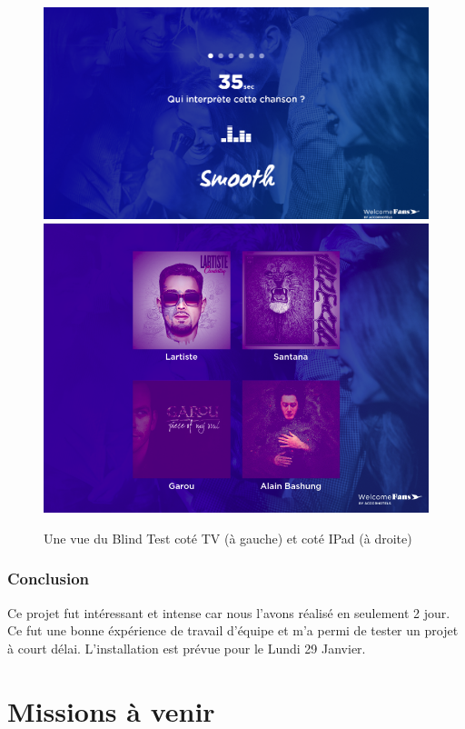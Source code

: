 \documentclass{article}
\begin{document}
\begin{figure}[h]
    \centering
    \includegraphics[scale=0.23]{blind-test-tv.png}
    \includegraphics[scale=0.22]{blind-test-ipad.png}
    \caption{Une vue du Blind Test coté TV (à gauche) et coté IPad (à droite)}
\end{figure}

\subsubsection{Conclusion}

Ce projet fut intéressant et intense car nous l'avons réalisé en seulement 2 jour.
Ce fut une bonne éxpérience de travail d'équipe et m'a permi de tester un projet à court délai.
L'installation est prévue pour le Lundi 29 Janvier.

\clearpage

\section{Missions à venir}
\end{document}
